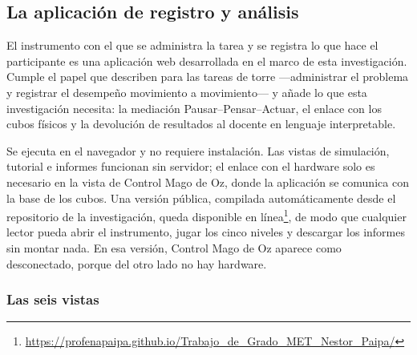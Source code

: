 \documentclass{book}
\begin{document}





\subsection{La aplicación de registro y análisis}
\label{sec:aplicacion}

El instrumento con el que se administra la tarea y se registra lo que hace
el participante es una aplicación web desarrollada en el marco de esta
investigación. Cumple el papel que \citet{HinzKostov2009} describen para
las tareas de torre —administrar el problema y registrar el desempeño
movimiento a movimiento— y añade lo que esta investigación necesita: la
mediación Pausar--Pensar--Actuar, el enlace con los cubos físicos y la
devolución de resultados al docente en lenguaje interpretable.

Se ejecuta en el navegador y no requiere instalación. Las vistas de
simulación, tutorial e informes funcionan sin servidor; el enlace con el
hardware solo es necesario en la vista de Control Mago de Oz, donde la
aplicación se comunica con la base de los cubos. Una versión pública,
compilada automáticamente desde el repositorio de la investigación, queda
disponible en línea\footnote{\url{https://profenapaipa.github.io/Trabajo_de_Grado_MET_Nestor_Paipa/}},
de modo que cualquier lector pueda abrir el instrumento, jugar los cinco
niveles y descargar los informes sin montar nada. En esa versión, Control
Mago de Oz aparece como desconectado, porque del otro lado no hay
hardware.

\subsubsection{Las seis vistas}
\end{document}
